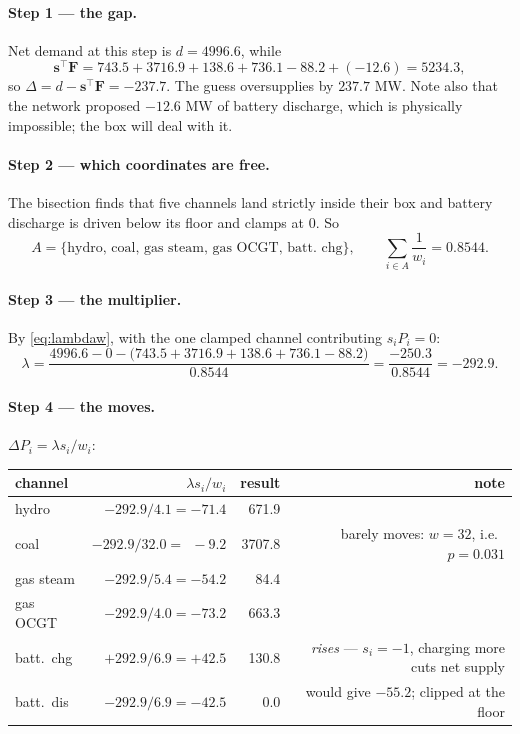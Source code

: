 \documentclass[11pt]{article}
\newcommand{\s}{\mathbf{s}}
\newcommand{\F}{\mathbf{F}}
\begin{document}
\paragraph{Step 1 --- the gap.} Net demand at this step is $d = 4996.6$, while
\[
  \s^{\!\top}\F = 743.5 + 3716.9 + 138.6 + 736.1 - 88.2 + (-12.6) = 5234.3,
\]
so $\Delta = d - \s^{\!\top}\F = -237.7$. The guess oversupplies by $237.7$ MW.
Note also that the network proposed $-12.6$ MW of battery discharge, which is
physically impossible; the box will deal with it.

\paragraph{Step 2 --- which coordinates are free.} The bisection finds that five
channels land strictly inside their box and battery discharge is driven below
its floor and clamps at $0$. So
\[
  A = \{\text{hydro, coal, gas steam, gas OCGT, batt.\ chg}\},
  \qquad
  \sum_{i\in A}\frac{1}{w_i} = 0.8544 .
\]

\paragraph{Step 3 --- the multiplier.} By \eqref{eq:lambdaw}, with the one
clamped channel contributing $s_i P_i = 0$:
\[
  \lambda = \frac{4996.6 - 0 - \bigl(743.5+3716.9+138.6+736.1-88.2\bigr)}{0.8544}
          = \frac{-250.3}{0.8544} = -292.9 .
\]

\paragraph{Step 4 --- the moves.} $\Delta P_i = \lambda s_i / w_i$:
\begin{center}
\small
\begin{tabular}{lrrr}
\toprule
channel & $\lambda s_i / w_i$ & result & note \\
\midrule
hydro        & $-292.9/4.1  = -71.4$ &  671.9 & \\
coal         & $-292.9/32.0 = \ \ -9.2$ & 3707.8 & barely moves: $w=32$, i.e.\ $p=0.031$ \\
gas steam    & $-292.9/5.4  = -54.2$ &   84.4 & \\
gas OCGT     & $-292.9/4.0  = -73.2$ &  663.3 & \\
batt.\ chg   & $+292.9/6.9  = +42.5$ &  130.8 & \emph{rises} --- $s_i=-1$, charging more cuts net supply \\
batt.\ dis   & $-292.9/6.9  = -42.5$ &    0.0 & would give $-55.2$; clipped at the floor \\
\bottomrule
\end{tabular}
\end{center}
\end{document}
